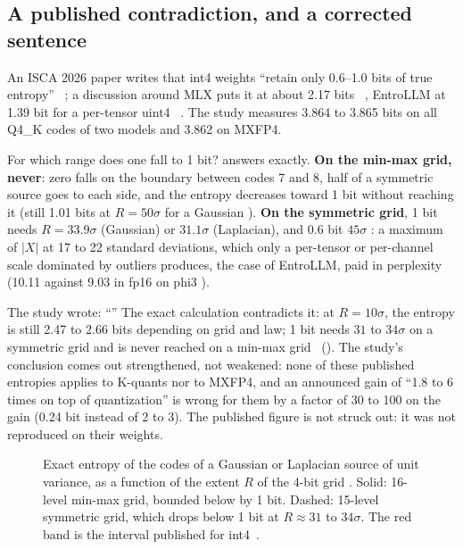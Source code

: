 \subsection{A published contradiction, and a corrected sentence}\label{sec:ent-contradiction}

An ISCA 2026 paper writes that int4 weights ``retain only 0.6--1.0 bits of true entropy''~\cite{shannonbound2026} \litt; a discussion around MLX puts it at about 2.17 bits~\cite{mlx3043} \litt, EntroLLM at 1.39 bit for a per-tensor uint4~\cite{entrollm2025} \litt. The study measures 3.864 to 3.865 bits on all Q4\_K codes of two models and 3.862 on MXFP4.

For which range does one fall to 1 bit?  answers exactly. \textbf{On the min-max grid, never}: zero falls on the boundary between codes 7 and 8, half of a symmetric source goes to each side, and the entropy decreases toward 1 bit without reaching it (still 1.01 bits at $R = 50\sigma$ for a Gaussian \calc). \textbf{On the symmetric grid}, 1 bit needs $R = 33.9\sigma$ (Gaussian) or $31.1\sigma$ (Laplacian), and 0.6 bit $45\sigma$ \calc: a maximum of $|X|$ at 17 to 22 standard deviations, which only a per-tensor or per-channel scale dominated by outliers produces, the case of EntroLLM, paid in perplexity (10.11 against 9.03 in fp16 on phi3 \litt).

The study wrote: \enquote{} The exact calculation contradicts it: at $R = 10\sigma$, the entropy is still 2.47 to 2.66 bits depending on grid and law; 1 bit needs $31$ to $34\sigma$ on a symmetric grid and is never reached on a min-max grid \calc~(). The study's conclusion comes out strengthened, not weakened: none of these published entropies applies to K-quants nor to MXFP4, and an announced gain of ``1.8 to 6 times on top of quantization'' is wrong for them by a factor of 30 to 100 on the gain (0.24 bit instead of 2 to 3). The published figure is not struck out: it was not reproduced on their weights.

\begin{figure}[ht]
\centering
\GrapheEntropiePlage
\caption[Entropy of the codes by quantization range]{Exact entropy of the codes of a Gaussian or Laplacian source of unit variance, as a function of the extent $R$ of the 4-bit grid \calc. Solid: 16-level min-max grid, bounded below by 1 bit. Dashed: 15-level symmetric grid, which drops below 1 bit at $R \approx 31$ to $34\sigma$. The red band is the interval published for int4~\cite{shannonbound2026}.}
\label{fig:ent-plage}
\end{figure}

